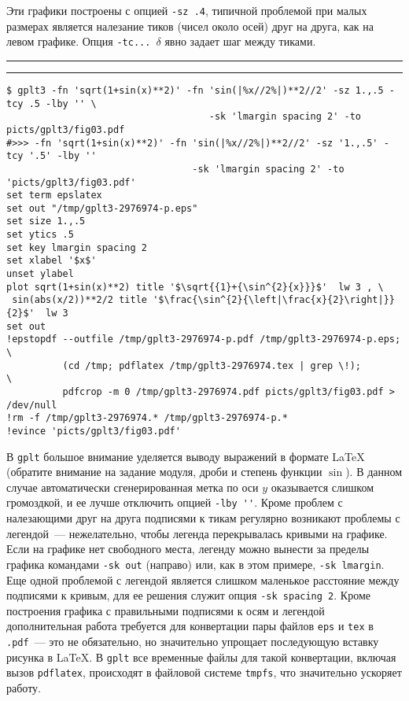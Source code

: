 \documentclass[12pt]{article}
\def\gplt{{\tt gplt}}
\def\pdf{{\tt .pdf}}
\begin{document}
\vspace{3mm} 

Эти графики построены с опцией \verb'-sz .4', типичной проблемой при малых размерах является налезание тиков (чисел около осей) друг на друга, как на левом графике.
Опция \verb'-tc... '$\delta$ явно задает шаг между тиками.\\


\noindent\rule{.45\textwidth}{1pt}\hfill \raisebox{-.45\height}{\bf № 2.}  \hfill\rule{.45\textwidth}{1pt}

{\small
\begin{verbatim}
$ gplt3 -fn 'sqrt(1+sin(x)**2)' -fn 'sin(|%x//2%|)**2//2' -sz 1.,.5 -tcy .5 -lby '' \
                                    -sk 'lmargin spacing 2' -to picts/gplt3/fig03.pdf
#>>> -fn 'sqrt(1+sin(x)**2)' -fn 'sin(|%x//2%|)**2//2' -sz '1.,.5' -tcy '.5' -lby '' 
                                 -sk 'lmargin spacing 2' -to 'picts/gplt3/fig03.pdf'
set term epslatex 
set out "/tmp/gplt3-2976974-p.eps"
set size 1.,.5
set ytics .5
set key lmargin spacing 2
set xlabel '$x$'
unset ylabel
plot sqrt(1+sin(x)**2) title '$\sqrt{{1}+{\sin^{2}{x}}}$'  lw 3 , \
 sin(abs(x/2))**2/2 title '$\frac{\sin^{2}{\left|\frac{x}{2}\right|}}{2}$'  lw 3 
set out
!epstopdf --outfile /tmp/gplt3-2976974-p.pdf /tmp/gplt3-2976974-p.eps;        \
          (cd /tmp; pdflatex /tmp/gplt3-2976974.tex | grep \!);               \
          pdfcrop -m 0 /tmp/gplt3-2976974.pdf picts/gplt3/fig03.pdf > /dev/null
!rm -f /tmp/gplt3-2976974.* /tmp/gplt3-2976974-p.*
!evince 'picts/gplt3/fig03.pdf'
\end{verbatim}
  }
\begin{figure}
  \begin{center}
\end{center}
\end{figure}
\noindent
В \gplt{} большое внимание уделяется выводу выражений в формате \LaTeX{} (обратите внимание на задание модуля, дроби и степень функции $\sin$).
В данном случае автоматически сгенерированная метка по оси $y$ оказывается слишком громоздкой, и ее лучше отключить опцией \verb|-lby ''|.
Кроме проблем с налезающими друг на друга подписями к тикам регулярно возникают проблемы с легендой~--- нежелательно, чтобы легенда
перекрывалась кривыми на графике. Если на графике нет свободного места, легенду можно вынести за пределы графика командами \verb'-sk out' (направо)
или, как в этом примере, \verb'-sk lmargin'. Еще одной проблемой с легендой является слишком маленькое расстояние между подписями к кривым,
для ее решения служит опция \verb'-sk spacing 2'. Кроме построения графика с правильными подписями к осям и легендой дополнительная работа
требуется для конвертации пары файлов \verb'eps' и \verb'tex' в \pdf~--- это не обязательно, но значительно упрощает последующую вставку рисунка
в \LaTeX. В \gplt{} все временные файлы для такой конвертации, включая вызов \verb'pdflatex', происходят в файловой системе \verb'tmpfs',
что значительно ускоряет работу.\\
\end{document}
